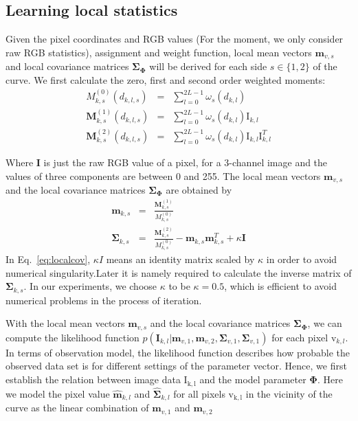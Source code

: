 \subsection{Learning local statistics}
\label{sec:lls}

Given the pixel coordinates and RGB values (For the moment, we only consider raw RGB
statistics), assignment and weight
function, local mean vectors $\mathbf{m}_{v,s}$  and local covariance matrices
$\mathbf{\Sigma}_{\mathbf{\Phi}}$ will be derived for each side $s \in
\{1,2\}$ of the curve.
We first calculate the zero, first and second order weighted moments:
\begin{eqnarray}
  \label{eq:localm}
  M_{k,s}^{(0)}(d_{k,l,s}) &=& \sum_{l=0}^{2L-1} \omega_s(d_{k,l})\\
  \mathbf{M}_{k,s}^{(1)}(d_{k,l,s}) &=& \sum_{l=0}^{2L-1} \omega_s(d_{k,l}) \mathrm{I}_{k,l}\\
  \mathbf{M}_{k,s}^{(2)}(d_{k,l,s}) &=& \sum_{l=0}^{2L-1} \omega_s(d_{k,l}) \mathrm{I}_{k,l}\mathrm{I}_{k,l}^T
\end{eqnarray}

Where $\mathbf{I}$ is just the raw RGB value of a pixel, for a
3-channel image and the values of three components
are  between 0 and 255. The local mean vectors $\mathbf{m}_{v,s}$  and
the local covariance matrices
$\mathbf{\Sigma}_{\mathbf{\Phi}}$  are obtained by
\begin{eqnarray}
  \label{eq:localmean}
  \mathbf{m}_{k,s} &=& \frac{\mathbf{M}^{(1)}_{k,s}}{M^{(0)}_{k,s}}\\
  \label{eq:localcov}
  \mathbf{\Sigma}_{k,s} &=& \frac{\mathbf{M}^{(2)}_{k,s}}{M^{(0)}_{k,s}}
  - \mathbf{m}_{k,s}\mathbf{m}_{k,s}^T  + \kappa \mathbf{I}
\end{eqnarray}
In Eq.~\ref{eq:localcov}, $\kappa I$  means an identity matrix scaled by
$\kappa$ in order to avoid numerical singularity.Later it is namely
required to calculate the inverse matrix of
$\mathbf{\Sigma}_{k,s}$. In our experiments, we choose $\kappa$ to be
$\kappa = 0.5$, which is efficient to avoid numerical problems in the
process of iteration.

With the local mean vectors $\mathbf{m}_{v,s}$  and the local covariance matrices
$\mathbf{\Sigma}_{\mathbf{\Phi}}$, we can compute the
likelihood function   $p(\mathbf{I}_{k,l} | \mathbf{m}_{v,1}, \mathbf{m}_{v,2},
  \mathbf{\Sigma}_{v,1}, \mathbf{\Sigma}_{v,1})$ for each pixel
  $\mathrm{v}_{k,l}$. In terms of observation model, the likelihood
  function describes how probable the observed data set is for
  different settings of the parameter vector. Hence, we first establish
  the relation between image data $\mathrm{I_{k,l}}$ and the model
  parameter $\mathbf{\Phi}$. Here we model the pixel value
  $\hat{\mathbf{m}}_{k,l}$ and $\hat{\mathbf{\Sigma}}_{k,l}$
  for all pixels $\mathrm{v_{k,l}}$ in the vicinity of the curve as the
  linear combination of $\mathbf{m}_{v,1}$ and $\mathbf{m}_{v,2}$


